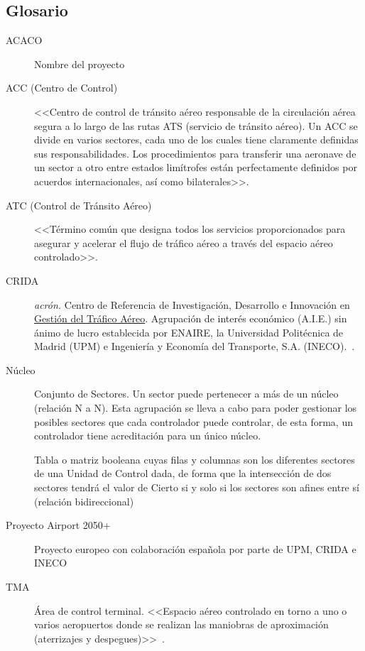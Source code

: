 \subsection{Glosario}
\label{sec:Definiciones}
\begin{description}
    \item[ACACO] \label{ACABO} Nombre del proyecto
    
    
    \item[ACC (Centro de Control)] \label{ACC}
    <<Centro de control de tránsito aéreo responsable de la circulación aérea segura a lo largo de las rutas ATS (servicio de tránsito aéreo). Un ACC se divide en varios sectores, cada uno de los cuales tiene claramente definidas sus responsabilidades. Los procedimientos para transferir una aeronave de un sector a otro entre estados limítrofes están perfectamente definidos por acuerdos internacionales, así como bilaterales>>.~\cite{ENAIRE-web}

    \item [ATC (Control de Tránsito Aéreo)] \label{ATC} <<Término común que designa todos los servicios proporcionados para asegurar y acelerar el flujo de tráfico aéreo a través del espacio aéreo controlado>>.~\cite{ENAIRE-web}

    \item [CRIDA] \label{CRIDA} \textit{acrón.} Centro de Referencia de Investigación, Desarrollo e Innovación 
    en \hyperref[ATC]{Gestión del Tráfico Aéreo}. Agrupación de interés económico (A.I.E.) sin ánimo de lucro 
    establecida por ENAIRE, la Universidad Politécnica de Madrid (UPM) e Ingeniería y Economía del Transporte, S.A. 
    (INECO).~\cite{CRIDA-web}.
    
    

    \item [Núcleo] \label{Nucleo} Conjunto de Sectores. Un sector puede pertenecer a más de un núcleo (relación N a N). Esta agrupación se lleva a cabo para poder gestionar los posibles sectores que cada controlador puede controlar, de esta forma, un controlador tiene acreditación para un único núcleo.

    \item[] Tabla o matriz booleana cuyas filas y columnas son los diferentes sectores de una Unidad de Control dada, de forma que la intersección de dos sectores tendrá el valor de Cierto si y solo si los sectores son afines entre sí (relación bidireccional)

    \item[Proyecto Airport 2050+] \label{AIRPORT} Proyecto europeo con colaboración española por parte de UPM, CRIDA e 
    INECO
   
    \item[TMA] \label{TMA} Área de control terminal. <<Espacio aéreo controlado en torno a uno o varios aeropuertos 
    donde se realizan las maniobras de aproximación (aterrizajes y despegues)>>~\cite{ENAIRE-web}.
\end{description}















